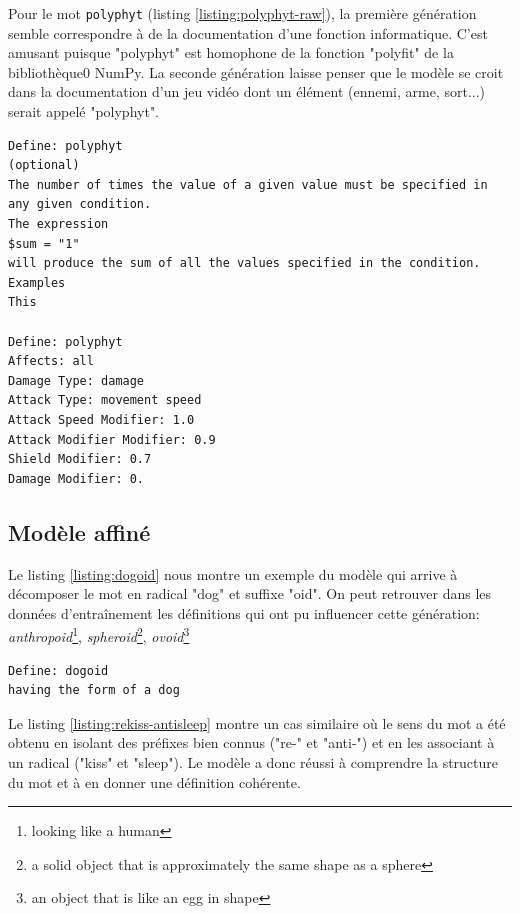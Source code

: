 \documentclass[french]{template}
\begin{document}
Pour le mot \texttt{polyphyt} (listing \ref{listing:polyphyt-raw}), la première génération semble correspondre à de la documentation d'une fonction informatique. C'est amusant puisque "polyphyt" est homophone de la fonction "polyfit" de la bibliothèque0 NumPy. La seconde génération laisse penser que le modèle se croit dans la documentation d'un jeu vidéo dont un élément (ennemi, arme, sort...) serait appelé "polyphyt".

\begin{listing}[H]
    \begin{verbatim}
Define: polyphyt
(optional)
The number of times the value of a given value must be specified in any given condition.
The expression
$sum = "1"
will produce the sum of all the values specified in the condition.
Examples
This

Define: polyphyt
Affects: all
Damage Type: damage
Attack Type: movement speed
Attack Speed Modifier: 1.0
Attack Modifier Modifier: 0.9
Shield Modifier: 0.7
Damage Modifier: 0.
    \end{verbatim}
    \caption{Générations du modèle GPT-2 non affiné pour le mot \texttt{polyphyt}}
    \label{listing:polyphyt-raw}
\end{listing}

\subsection{Modèle affiné}

Le listing \ref{listing:dogoid} nous montre un exemple du modèle qui arrive à décomposer le mot en radical "dog" et suffixe "oid". On peut retrouver dans les données d'entraînement les définitions qui ont pu influencer cette génération: \textit{anthropoid}\footnote{looking like a human}, \textit{spheroid}\footnote{a solid object that is approximately the same shape as a sphere}, \textit{ovoid}\footnote{an object that is like an egg in shape}

\begin{listing}[H]
    \begin{verbatim}
Define: dogoid
having the form of a dog
    \end{verbatim}
    \caption{Génération du modèle GPT-2 affiné pour le mot \texttt{dogoid}}
    \label{listing:dogoid}
\end{listing}

Le listing \ref{listing:rekiss-antisleep} montre un cas similaire où le sens du mot a été obtenu en isolant des préfixes bien connus ("re-" et "anti-") et en les associant à un radical ("kiss" et "sleep"). Le modèle a donc réussi à comprendre la structure du mot et à en donner une définition cohérente.
\end{document}
